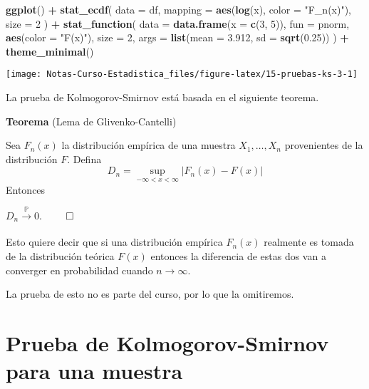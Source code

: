 \documentclass[
  12pt,
]{book}
\newenvironment{Shaded}{\begin{snugshade}}{\end{snugshade}}
\newcommand{\DataTypeTok}[1]{\textcolor[rgb]{0.13,0.29,0.53}{#1}}
\newcommand{\DecValTok}[1]{\textcolor[rgb]{0.00,0.00,0.81}{#1}}
\newcommand{\FloatTok}[1]{\textcolor[rgb]{0.00,0.00,0.81}{#1}}
\newcommand{\KeywordTok}[1]{\textcolor[rgb]{0.13,0.29,0.53}{\textbf{#1}}}
\newcommand{\NormalTok}[1]{#1}
\newcommand{\OperatorTok}[1]{\textcolor[rgb]{0.81,0.36,0.00}{\textbf{#1}}}
\newcommand{\StringTok}[1]{\textcolor[rgb]{0.31,0.60,0.02}{#1}}
\begin{document}
\begin{Shaded}
\begin{Highlighting}[]
\KeywordTok{ggplot}\NormalTok{() }\OperatorTok{+}
\StringTok{  }\KeywordTok{stat\_ecdf}\NormalTok{(}
    \DataTypeTok{data =}\NormalTok{ df,}
    \DataTypeTok{mapping =} \KeywordTok{aes}\NormalTok{(}\KeywordTok{log}\NormalTok{(x), }\DataTypeTok{color =} \StringTok{"F\_n(x)"}\NormalTok{),}
    \DataTypeTok{size =} \DecValTok{2}
\NormalTok{  ) }\OperatorTok{+}
\StringTok{  }\KeywordTok{stat\_function}\NormalTok{(}
    \DataTypeTok{data =} \KeywordTok{data.frame}\NormalTok{(}\DataTypeTok{x =} \KeywordTok{c}\NormalTok{(}\DecValTok{3}\NormalTok{, }\DecValTok{5}\NormalTok{)),}
    \DataTypeTok{fun =}\NormalTok{ pnorm,}
    \KeywordTok{aes}\NormalTok{(}\DataTypeTok{color =} \StringTok{"F(x)"}\NormalTok{),}
    \DataTypeTok{size =} \DecValTok{2}\NormalTok{,}
    \DataTypeTok{args =} \KeywordTok{list}\NormalTok{(}\DataTypeTok{mean =} \FloatTok{3.912}\NormalTok{, }\DataTypeTok{sd =} \KeywordTok{sqrt}\NormalTok{(}\FloatTok{0.25}\NormalTok{))}
\NormalTok{  ) }\OperatorTok{+}
\StringTok{  }\KeywordTok{theme\_minimal}\NormalTok{()}
\end{Highlighting}
\end{Shaded}

\begin{center}\texttt{[image: Notas-Curso-Estadistica\_files/figure-latex/15-pruebas-ks-3-1]} \end{center}

La prueba de Kolmogorov-Smirnov está basada en el siguiente teorema.

\textbf{Teorema} (Lema de Glivenko-Cantelli)

Sea \(F_n(x)\) la distribución empírica de una muestra \(X_1, \dots , X_n\)
provenientes de la distribución \(F\). Defina
\[
D_n = \sup_{-\infty<x<\infty}|F_n(x)-F(x)|
\]
Entonces

\(D_n\xrightarrow[]{\mathbb P} 0\). \(\qed\)

Esto quiere decir que si una distribución empírica \(F_n(x)\) realmente es
tomada de la distribución teórica \(F(x)\) entonces la diferencia de estas dos
van a converger en probabilidad cuando \(n \to \infty\).

La prueba de esto no es parte del curso, por lo que la omitiremos.

\hypertarget{prueba-de-kolmogorov-smirnov-para-una-muestra}{%
\section{Prueba de Kolmogorov-Smirnov para una muestra}\label{prueba-de-kolmogorov-smirnov-para-una-muestra}}
\end{document}
